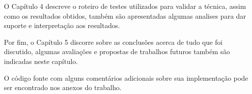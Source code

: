 O Capítulo 4 descreve o roteiro de testes utilizados para validar a técnica,
assim como os resultados obtidos, também são apresentadas algumas analises para
dar suporte e interpretação aos resultados.

Por fim, o Capítulo 5 discorre sobre as conclusões acerca de tudo que foi
discutido, algumas avaliações e propostas de trabalhos futuros também são
indicadas neste capítulo.

O código fonte com alguns comentários adicionais sobre sua implementação pode
ser encontrado nos anexos do trabalho.
